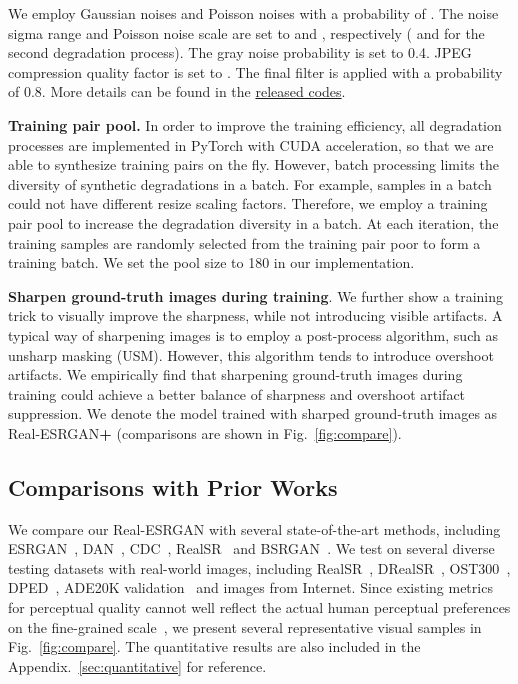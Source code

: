 \documentclass[10pt,twocolumn,letterpaper]{article}
\begin{document}
We employ Gaussian noises and Poisson noises with a probability of . The noise sigma range and Poisson noise scale are set to  and , respectively ( and  for the second degradation process).
The gray noise probability is set to 0.4.
JPEG compression quality factor is set to .
The final  filter is applied with a probability of 0.8.
More details can be found in the \href{https://github.com/xinntao/Real-ESRGAN}{released codes}.

\noindent\textbf{Training pair pool.}
In order to improve the training efficiency, all degradation processes are implemented in PyTorch with CUDA acceleration, so that we are able to synthesize training pairs on the fly.
However, batch processing limits the diversity of synthetic degradations in a batch. For example, samples in a batch could not have different resize scaling factors.
Therefore, we employ a training pair pool to increase the degradation diversity in a batch.
At each iteration, the training samples are randomly selected from the training pair poor to form a training batch.
We set the pool size to 180 in our implementation.

\noindent\textbf{Sharpen ground-truth images during training}.
We further show a training trick to visually improve the sharpness, while not introducing visible artifacts.
A typical way of sharpening images is to employ a post-process algorithm, such as unsharp masking (USM).
However, this algorithm tends to introduce overshoot artifacts.
We empirically find that sharpening ground-truth images during training could achieve a better balance of sharpness and overshoot artifact suppression.
We denote the model trained with sharped ground-truth images as Real-ESRGAN\textbf{+} (comparisons are shown in Fig.~\ref{fig:compare}).

\subsection{Comparisons with Prior Works}
We compare our Real-ESRGAN with several state-of-the-art methods, including ESRGAN~\cite{wang2018esrgan}, DAN~\cite{luo2020unfolding}, CDC~\cite{wei2020cdc}, RealSR~\cite{ji2020real} and BSRGAN~\cite{zhang2021designing}.
We test on several diverse testing datasets with real-world images, including RealSR~\cite{cai2019toward}, DRealSR~\cite{wei2020cdc}, OST300~\cite{wang2018sftgan}, DPED~\cite{ignatov2017dslr}, ADE20K validation~\cite{zhou2019semantic} and images from Internet.
Since existing metrics for perceptual quality cannot well reflect the actual human perceptual preferences on the fine-grained scale~\cite{blau20182018}, we present several representative visual samples in Fig.~\ref{fig:compare}.
The quantitative results are also included in the Appendix.~\ref{sec:quantitative} for reference.
\end{document}
